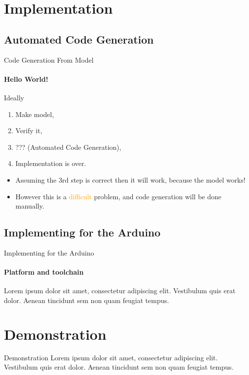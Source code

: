 \section{Implementation}
    \subsection{Automated Code Generation}
    \begin{frame}[t]{Code Generation From Model}\framesubtitle{Hello World!}
        Ideally
        \begin{enumerate}
            \item Make model,
            \item Verify it,
            \item ??? (Automated Code Generation),
            \item Implementation is over.
        \end{enumerate}
        \bigskip
        \begin{itemize}
            \item <2->Assuming the 3rd step is correct then it will work, because the model works!
            \item <3->However this is a \textcolor{orange}{difficult} problem, and code generation will be done manually. 
        \end{itemize}
    \end{frame}
    \subsection{Implementing for the Arduino}
    \begin{frame}[t]{Implementing for the Arduino}\framesubtitle{Platform and toolchain}
        Lorem ipsum dolor sit amet, consectetur adipiscing elit. Vestibulum quis erat dolor. Aenean tincidunt sem non quam feugiat tempus.
    \end{frame}
\section{Demonstration}
    \begin{frame}[t]{Demonstration}
        Lorem ipsum dolor sit amet, consectetur adipiscing elit. Vestibulum quis erat dolor. Aenean tincidunt sem non quam feugiat tempus.
    \end{frame}
